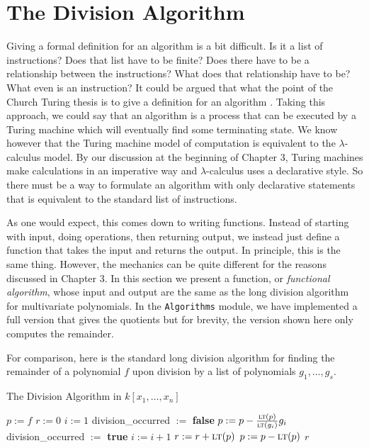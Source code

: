 \documentclass[MS, xcolor=dvipsnames]{wfuthesis}
\newcommand{\LT}{\ensuremath{\text{\sc lt}}}
\theoremstyle{definition}
\begin{document}
\section{The Division Algorithm}
Giving a formal definition for an algorithm is a bit difficult. Is it a list of instructions? Does that list have to be finite? Does there have to be a relationship between the instructions? What does that relationship have to be? What even is an instruction? It could be argued that what the point of the Church Turing thesis is to give a definition for an algorithm \cite{Kleene1952}. Taking this approach, we could say that an algorithm is a process that can be executed by a Turing machine which will eventually find some terminating state. We know however that the Turing machine model of computation is equivalent to the $\lambda$-calculus model. By our discussion at the beginning of Chapter 3, Turing machines make calculations in an imperative way and $\lambda$-calculus uses a declarative style. So there must be a way to formulate an algorithm with only declarative statements that is equivalent to the standard list of instructions. \par 
As one would expect, this comes down to writing functions. Instead of starting with input, doing operations, then returning output, we instead just define a function that takes the input and returns the output. In principle, this is the same thing. However, the mechanics can be quite different for the reasons discussed in Chapter 3. In this section we present a function, or \emph{functional algorithm}, whose input and output are the same as the long division algorithm for multivariate polynomials. In the \lstinline{Algorithms} module, we have implemented a full version that gives the quotients but for brevity, the version shown here only computes the remainder. \par 
For comparison, here is the standard long division algorithm for finding the remainder of a polynomial $f$ upon division by a list of polynomials $g_1,\dots,g_s$. \par 
\begin{algorithm}
\caption{The Division Algorithm in $k[x_1,\dots,x_n]$}
\begin{algorithmic}
  \State $p:= f$
  \State $r:= 0$
    \State $i:= 1$
    \State division\_occurred $:=$ \textbf{false}
      \If{($\LT(g_i)$ divides $\LT(p)$)}
        \State $p := p - \frac{\LT(p)}{\LT(g_i)}g_i$
        \State division\_occurred $:=$ \textbf{true}
      \Else
        \State $i:= i+1$
      \EndIf
    \EndWhile
      \State $r := r + \LT(p)$
      \State $p := p - \LT(p)$
    \EndIf
  \EndWhile
  \State \Return $r$
\end{algorithmic}
\end{algorithm}
\end{document}
